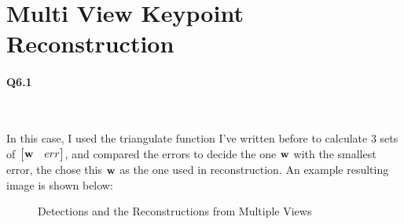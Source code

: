 \documentclass[11pt]{article} \usepackage{fullpage} \usepackage{graphicx} \usepackage{epstopdf} \usepackage{color} \usepackage{psfrag} \usepackage{pdfsync}\usepackage{indentfirst}\usepackage{subfigure}\usepackage{float}\usepackage[section]{placeins}
\begin{document}
\section{Multi View Keypoint Reconstruction}

\paragraph{Q6.1}~{}

In this case, I used the triangulate function I've written before to calculate $3$ sets of $\begin{bmatrix} \bold{w} & err \end{bmatrix}$, and compared the errors to decide the one $\bold{w}$ with the smallest error, the chose this $\bold{w}$ as the one used in reconstruction. An example resulting image is shown below:
\begin{figure}[H]
\centering
{}
\caption{Detections and the Reconstructions from Multiple Views}
\end{figure}
\end{document}
